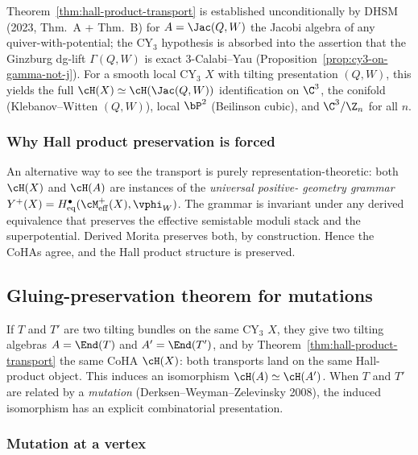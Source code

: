 Theorem~\ref{thm:hall-product-transport} is established unconditionally by
DHSM (2023, Thm.~A + Thm.~B) for $A = \Jac(Q, W)$ the Jacobi algebra of any
quiver-with-potential; the CY$_3$ hypothesis is absorbed into the assertion
that the Ginzburg dg-lift $\Gamma(Q, W)$ is exact $3$-Calabi--Yau
(Proposition~\ref{prop:cy3-on-gamma-not-j}). For a smooth local CY$_3$ $X$
with tilting presentation $(Q, W)$, this yields the full
$\cH(X) \simeq \cH(\Jac(Q, W))$ identification on $\C^3$, the conifold
(Klebanov--Witten $(Q, W)$), local $\bP^2$ (Beilinson cubic), and
$\C^3/\Z_n$ for all $n$.

\subsubsection{Why Hall product preservation is forced}

An alternative way to see the transport is purely representation-theoretic:
both $\cH(X)$ and $\cH(A)$ are instances of the \emph{universal positive-
geometry grammar} $Y^+(X) = H^\bullet_{\mathrm{eq}}(\cM^+_{\mathrm{eff}}(X),
\vphi_W)$. The
grammar is invariant under any derived equivalence that preserves the
effective semistable moduli stack and the superpotential. Derived Morita
preserves both, by construction. Hence the CoHAs agree, and the Hall product
structure is preserved.

\subsection{Gluing-preservation theorem for mutations}
\label{sec:mutation-preservation}

If $T$ and $T'$ are two tilting bundles on the same CY$_3$ $X$, they give two
tilting algebras $A = \End(T)$ and $A' = \End(T')$, and by
Theorem~\ref{thm:hall-product-transport} the same CoHA $\cH(X)$: both
transports land on the same Hall-product object. This induces an isomorphism
$\cH(A) \simeq \cH(A')$. When $T$ and $T'$ are related by a \emph{mutation}
(Derksen--Weyman--Zelevinsky 2008), the induced isomorphism has an explicit
combinatorial presentation.

\subsubsection{Mutation at a vertex}

